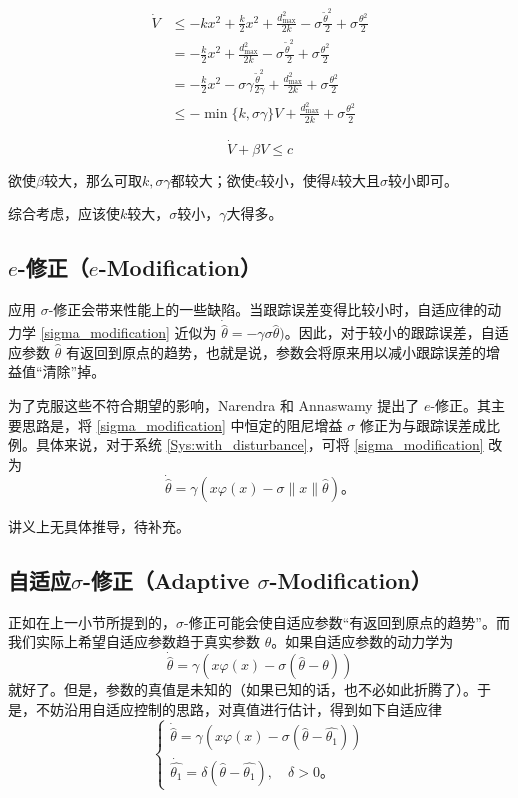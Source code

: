 \begin{align*}
\dot{V} & \leq - kx^{2} + \frac{k}{2}x^{2} + \frac{d_{\max}^{2}}{2k} - \sigma\frac{{\tilde{\theta}}^{2}}{2} + \sigma\frac{\theta^{2}}{2} \\
 & = - \frac{k}{2}x^{2} + \frac{d_{\max}^{2}}{2k} - \sigma\frac{{\tilde{\theta}}^{2}}{2} + \sigma\frac{\theta^{2}}{2} \\
 & = - \frac{k}{2}x^{2} - \sigma\gamma\frac{{\tilde{\theta}}^{2}}{2\gamma} + \frac{d_{\max}^{2}}{2k} + \sigma\frac{\theta^{2}}{2} \\
 & \leq - \min\{ k,\sigma\gamma\} V + \frac{d_{\max}^{2}}{2k} + \sigma\frac{\theta^{2}}{2}
\end{align*}

\[\dot{V} + \beta V \leq c\]

欲使\(\beta\)较大，那么可取\(k,\sigma\gamma\)都较大；欲使\(c\)较小，使得\(k\)较大且\(\sigma\)较小即可。

综合考虑，应该使\(k\)较大，\(\sigma\)较小，\(\gamma\)大得多。


\subsection{\texorpdfstring{$e$-修正（$e$-Modification）}{e-修正（e-Modification）}}

应用 $\sigma$-修正会带来性能上的一些缺陷。当跟踪误差变得比较小时，自适应律的动力学 \eqref{sigma_modification} 近似为 $\dot{\hat{\theta}} = -\gamma \sigma\hat{\theta})$。因此，对于较小的跟踪误差，自适应参数 $\hat{\theta}$ 有返回到原点的趋势，也就是说，参数会将原来用以减小跟踪误差的增益值“清除”掉。

为了克服这些不符合期望的影响，Narendra 和 Annaswamy 提出了 $e$-修正。其主要思路是，将 \eqref{sigma_modification} 中恒定的阻尼增益 $\sigma$ 修正为与跟踪误差成比例。具体来说，对于系统 \eqref{Sys:with_disturbance}，可将 \eqref{sigma_modification} 改为
\[
    \dot{\hat{\theta}} = \gamma \left( x\varphi(x) - \sigma \| x \| \hat{\theta} \right) \text{。}
\]

讲义上无具体推导，待补充。

\subsection{\texorpdfstring{自适应$\sigma$-修正（Adaptive $\sigma$-Modification）}{自适应σ-修正（Adaptive σ-Modification）}}

正如在上一小节所提到的，$\sigma$-修正可能会使自适应参数“有返回到原点的趋势”。而我们实际上希望自适应参数趋于真实参数 $\theta$。如果自适应参数的动力学为
\[
    \dot{\hat{\theta}} = \gamma \left( x\varphi(x) - \sigma \left(\hat{\theta} - \theta \right) \right)
\]
就好了。但是，参数的真值是未知的（如果已知的话，也不必如此折腾了）。于是，不妨沿用自适应控制的思路，对真值进行估计，得到如下自适应律
\[
\begin{cases}
    \dot{\hat{\theta}} = \gamma \left( x\varphi(x) - \sigma \left(\hat{\theta} - \hat{\theta_1} \right) \right) \\
    \dot{\hat{\theta_1}} = \delta \left( \hat{\theta} - \hat{\theta_1} \right), \quad \delta > 0 \text{。}
\end{cases}
\]

